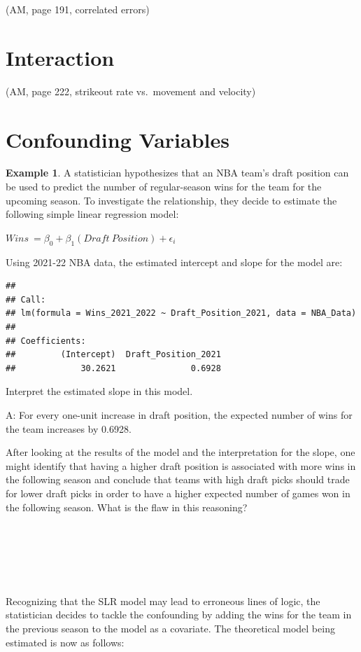 \documentclass[
  11pt,
]{book}
\theoremstyle{definition}
\theoremstyle{definition}
\newtheorem{example}{Example}[chapter]
\theoremstyle{definition}
\theoremstyle{definition}
\theoremstyle{remark}
\begin{document}
(AM, page 191, correlated errors)

\hypertarget{interaction}{%
\section{Interaction}\label{interaction}}

(AM, page 222, strikeout rate vs.~movement and velocity)

\hypertarget{confounding-variables}{%
\section{Confounding Variables}\label{confounding-variables}}

\begin{example}
A statistician hypothesizes that an NBA team's draft position can be used to predict the number of regular-season wins for the team for the upcoming season. To investigate the relationship, they decide to estimate the following simple linear regression model:

\(Wins\ = \beta_0 + \beta_1(Draft\ Position) + \epsilon_i\)

Using 2021-22 NBA data, the estimated intercept and slope for the model are:

\begin{verbatim}
## 
## Call:
## lm(formula = Wins_2021_2022 ~ Draft_Position_2021, data = NBA_Data)
## 
## Coefficients:
##         (Intercept)  Draft_Position_2021  
##             30.2621               0.6928
\end{verbatim}

Interpret the estimated slope in this model.
\end{example}

A: For every one-unit increase in draft position, the expected number of wins for the team increases by 0.6928.

After looking at the results of the model and the interpretation for the slope, one might identify that having a higher draft position is associated with more wins in the following season and conclude that teams with high draft picks should trade for lower draft picks in order to have a higher expected number of games won in the following season. What is the flaw in this reasoning?

\(~\)

\(~\)

\(~\)

Recognizing that the SLR model may lead to erroneous lines of logic, the statistician decides to tackle the confounding by adding the wins for the team in the previous season to the model as a covariate. The theoretical model being estimated is now as follows:
\end{document}

